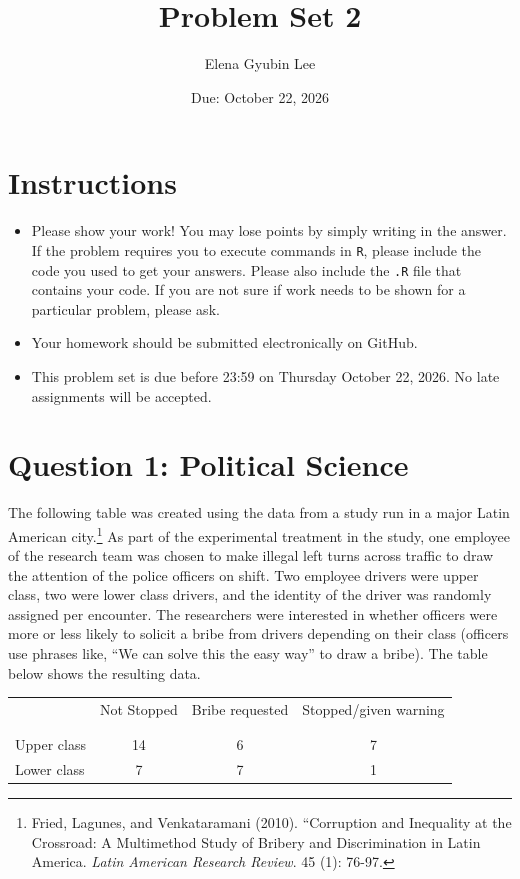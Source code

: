 \documentclass[12pt,letterpaper]{article}
\title{Problem Set 2}
\date{Due: October 22, 2026}
\author{Elena Gyubin Lee}
\begin{document}
	\maketitle
	\section*{Instructions}
\begin{itemize}
	\item Please show your work! You may lose points by simply writing in the answer. If the problem requires you to execute commands in \texttt{R}, please include the code you used to get your answers. Please also include the \texttt{.R} file that contains your code. If you are not sure if work needs to be shown for a particular problem, please ask.
	\item Your homework should be submitted electronically on GitHub.
	\item This problem set is due before 23:59 on Thursday October 22, 2026. No late assignments will be accepted.

\end{itemize}

	
	\vspace{.5cm}
	\section*{Question 1: Political Science}
		\vspace{.25cm}
	The following table was created using the data from a study run in a major Latin American city.\footnote{Fried, Lagunes, and Venkataramani (2010). ``Corruption and Inequality at the Crossroad: A Multimethod Study of Bribery and Discrimination in Latin America. \textit{Latin American Research Review}. 45 (1): 76-97.} As part of the experimental treatment in the study, one employee of the research team was chosen to make illegal left turns across traffic to draw the attention of the police officers on shift. Two employee drivers were upper class, two were lower class drivers, and the identity of the driver was randomly assigned per encounter. The researchers were interested in whether officers were more or less likely to solicit a bribe from drivers depending on their class (officers use phrases like, ``We can solve this the easy way'' to draw a bribe). The table below shows the resulting data.

\newpage
\begin{table}[h!]
	\centering
	\begin{tabular}{l | c c c }
		& Not Stopped & Bribe requested & Stopped/given warning \\
		\\[-1.8ex] 
		\hline \\[-1.8ex]
		Upper class & 14 & 6 & 7 \\
		Lower class & 7 & 7 & 1 \\
		\hline
	\end{tabular}
\end{table}
\end{document}
